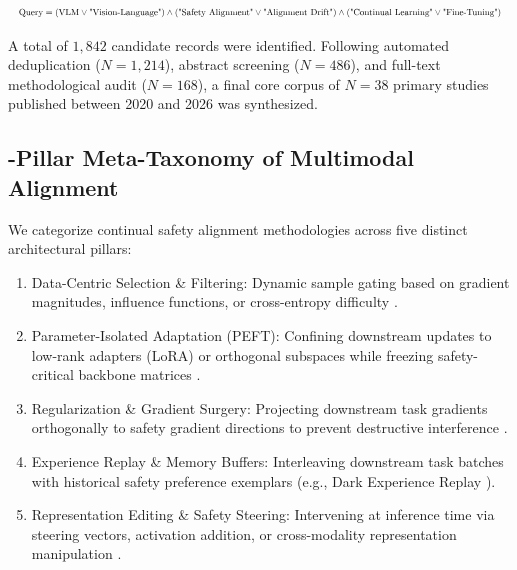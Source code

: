 \documentclass[10pt,twocolumn,letterpaper]{article}
\begin{document}
\begin{equation}
\resizebox{\columnwidth}{!}{$\displaystyle
\begin{aligned}
\text{Query} = (\text{VLM} \lor \text{"Vision-Language"}) \land (\text{"Safety Alignment"} \lor \text{"Alignment Drift"}) \land (\text{"Continual Learning"} \lor \text{"Fine-Tuning"})
\end{aligned}
$}
\end{equation}

















A total of $1,842$ candidate records were identified. Following automated deduplication ($N = 1,214$), abstract screening ($N = 486$), and full-text methodological audit ($N = 168$), a final core corpus of $N = 38$ primary studies published between 2020 and 2026 was synthesized.


\subsection{-Pillar Meta-Taxonomy of Multimodal Alignment}

We categorize continual safety alignment methodologies across five distinct architectural pillars:
\begin{enumerate}
  \item Data-Centric Selection \& Filtering: Dynamic sample gating based on gradient magnitudes, influence functions, or cross-entropy difficulty \cite{arxiv_2604_17215}.
  \item Parameter-Isolated Adaptation (PEFT): Confining downstream updates to low-rank adapters (LoRA) or orthogonal subspaces while freezing safety-critical backbone matrices \cite{arxiv_2308_12898}.
  \item Regularization \& Gradient Surgery: Projecting downstream task gradients orthogonally to safety gradient directions to prevent destructive interference \cite{arxiv_2404_01131}.
  \item Experience Replay \& Memory Buffers: Interleaving downstream task batches with historical safety preference exemplars (e.g., Dark Experience Replay \cite{arxiv_2406_04028}).
  \item Representation Editing \& Safety Steering: Intervening at inference time via steering vectors, activation addition, or cross-modality representation manipulation \cite{arxiv_2501_02497}.
\end{enumerate}
\end{document}
